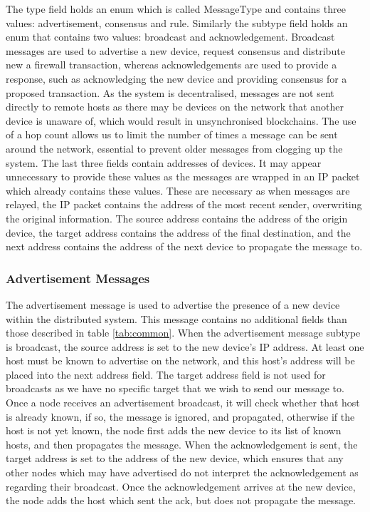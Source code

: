 \documentclass[a4paper, 11pt]{report}
\begin{document}
The type field holds an enum which is called MessageType and contains three values: advertisement, consensus and rule. Similarly the subtype field holds an enum that contains two values: broadcast and acknowledgement. Broadcast messages are used to advertise a new device, request consensus and distribute new a firewall transaction, whereas acknowledgements are used to provide a response, such as acknowledging the new device and providing consensus for a proposed transaction. As the system is decentralised, messages are not sent directly to remote hosts as there may be devices on the network that another device is unaware of, which would result in unsynchronised \gls{blockchain}s. The use of a hop count allows us to limit the number of times a message can be sent around the network, essential to prevent older messages from clogging up the system. The last three fields contain addresses of devices. It may appear unnecessary to provide these values as the messages are wrapped in an \acrshort{IP} packet which already contains these values. These are necessary as when messages are relayed, the \acrshort{IP} packet contains the address of the most recent sender, overwriting the original information. The source address contains the address of the origin device, the target address contains the address of the final destination, and the next address contains the address of the next device to propagate the message to.

\subsubsection{Advertisement Messages}
The advertisement message is used to advertise the presence of a new device within the distributed system. This message contains no additional fields than those described in table \ref{tab:common}. When the advertisement message subtype is broadcast, the source address is set to the new device's \acrshort{IP} address. At least one host must be known to advertise on the network, and this host's address will be placed into the next address field. The target address field is not used for broadcasts as we have no specific target that we wish to send our message to. Once a node receives an advertisement broadcast, it will check whether that host is already known, if so, the message is ignored, and propagated, otherwise if the host is not yet known, the node first adds the new device to its list of known hosts, and then propagates the message. When the acknowledgement is sent, the target address is set to the address of the new device, which ensures that any other nodes which may have advertised do not interpret the acknowledgement as regarding their broadcast. Once the acknowledgement arrives at the new device, the node adds the host which sent the ack, but does not propagate the message.
\end{document}
